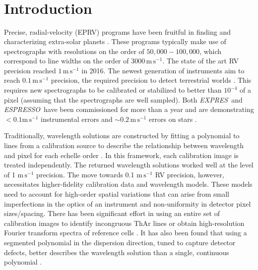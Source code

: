 \documentclass[modern]{aastex63}
\newcommand{\project}[1]{\textsl{#1}}
\newcommand{\acronym}[1]{{\small{#1}}}
\newcommand{\expres}{\project{\acronym{EXPRES}}}
\newcommand{\espresso}{\project{\acronym{ESPRESSO}}}
\newcommand{\eprv}{\acronym{EPRV}}
\newcommand{\mps}{\mathrm{m\,s^{-1}}}
\begin{document}
\section*{~}\pagebreak
\section{Introduction} 
Precise, radial-velocity (\eprv) programs have been fruitful in finding and characterizing extra-solar planets \citep[e.g.][]{mayor2011, bonfils2013, plavchan2015, butler2017}.  These programs typically make use of spectrographs with resolutions on the order of $50,000-100,000$, which correspond to line widths on the order of $3000\,\mps$.  The state of the art RV precision reached $1\, \mps$ in 2016.  The newest generation of instruments aim  to reach $0.1\,\mps$ precision, the required precision to detect terrestrial worlds \citep{fischer2016}.  This requires new spectrographs to be calibrated or stabilized to better than $10^{-4}$ of a pixel (assuming that the spectrographs are well sampled).  Both \expres\ and \espresso\ have been commissioned for more than a year and are demonstrating $<0.1 \mps$ instrumental errors and $\sim 0.2\, \mps$ errors on stars \citep{pepe2013, jurgenson2016, blackman2020, peterburg2020, brewer2020, mascareno2020}.


Traditionally, wavelength solutions are constructed by fitting a polynomial to lines from a calibration source to describe the relationship between wavelength and pixel for each echelle order \citep{butler1996, lovis2007, cersullo2019}.  In this framework, each calibration image is treated independently.  The returned wavelength solutions worked well at the level of 1 $\mps$ precision.  The move towards 0.1 $\mps$ RV precision, however, necessitates higher-fidelity calibration data and wavelength models.  These models need to account for high-order spatial variations that can arise from small imperfections in the optics of an instrument and non-uniformity in detector pixel sizes/spacing.  There has been significant effort in using an entire set of calibration images to identify incongruous ThAr lines \citep{coffinet2019} or obtain high-resolution Fourier transform spectra of reference cells \citep{wang2020}.  It has also been found that using a segmented polynomial in the dispersion direction, tuned to capture detector defects, better describes the wavelength solution than a single, continuous polynomial \citep{milakovic2020}.
\end{document}
